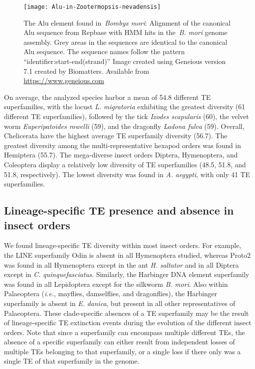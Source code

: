 \begin{figure}[h!]
\begin{center}
\texttt{[image: Alu-in-Zootermopsis-nevadensis]}
\caption[The Alu element found in the \emph{Bombyx mori} genome]{{The
Alu element found in~\emph{Bombyx mori}: Alignment of the canonical Alu
sequence from Repbase with HMM hits in the~\emph{B. mori} genome
assembly. Grey areas in the sequences are identical to the canonical Alu
sequence. The sequence names follow the pattern
``identifier:start-end(strand)'' Image created using Geneious version
7.1 created by Biomatters. Available from \url{https://www.geneious.com}
{\label{fig:alu-alignment}}%
}}
\end{center}
\end{figure}

On average, the analyzed species harbor a mean of 54.8 different TE
superfamilies, with the locust \emph{L. migratoria} exhibiting the
greatest diversity (61 different TE superfamilies), followed by the tick
\emph{Ixodes scapularis} (60), the velvet worm \emph{Euperipatoides
rowelli} (59), and the dragonfly \emph{Ladona fulva} (59). Overall,
Chelicerata have the highest average TE superfamily diversity (56.7).
The greatest diversity among the multi-representative hexapod orders was
found in Hemiptera (55.7). The mega-diverse insect orders Diptera,
Hymenoptera, and Coleoptera display a relatively low diversity of TE
superfamilies (48.5, 51.8, and 51.8, respectively). The lowest diversity
was found in \emph{A. aegypti}, with only 41 TE superfamilies.

\subsection{Lineage-specific TE presence and absence in insect orders}

We found lineage-specific TE diversity within most insect orders. For
example, the LINE superfamily Odin is absent in all Hymenoptera studied,
whereas Proto2 was found in all Hymenoptera except in the ant \emph{H.
saltator} and in all Diptera except in \emph{C. quinquefasciatus}.
Similarly, the Harbinger DNA element superfamily was found in all
Lepidoptera except for the silkworm \emph{B. mori}. Also within
Palaeoptera (\emph{i.e.}, mayflies, damselflies, and dragonflies), the
Harbinger superfamily is absent in \emph{E. danica}, but present in all
other representatives of Palaeoptera. These clade-specific absences of a
TE superfamily may be the result of lineage-specific TE extinction
events during the evolution of the different insect orders. Note that
since a superfamily can encompass multiple different TEs, the absence of
a specific superfamily can either result from independent losses of
multiple TEs belonging to that superfamily, or a single loss if there
only was a single TE of that superfamily in the genome.

